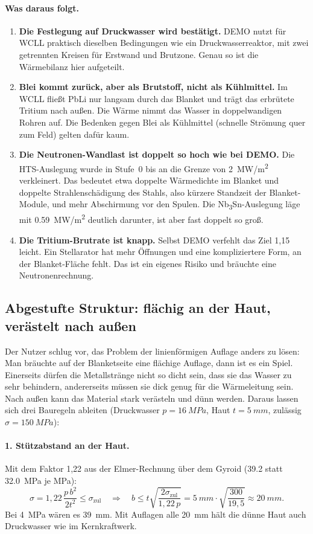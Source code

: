 \documentclass[10pt,a4paper]{article}
\begin{document}
\paragraph{Was daraus folgt.}
\begin{enumerate}\itemsep1pt
\item \textbf{Die Festlegung auf Druckwasser wird bestätigt.} DEMO nutzt für WCLL praktisch dieselben Bedingungen
  wie ein Druckwasserreaktor, mit zwei getrennten Kreisen für Erstwand und Brutzone. Genau so ist die Wärmebilanz
  hier aufgeteilt.
\item \textbf{Blei kommt zurück, aber als Brutstoff, nicht als Kühlmittel.} Im WCLL fließt PbLi nur langsam
  durch das Blanket und trägt das erbrütete Tritium nach außen. Die Wärme nimmt das Wasser in doppelwandigen
  Rohren auf. Die Bedenken gegen Blei als Kühlmittel (schnelle Strömung quer zum Feld) gelten dafür kaum.
\item \textbf{Die Neutronen-Wandlast ist doppelt so hoch wie bei DEMO.} Die HTS-Auslegung wurde in Stufe~0 bis
  an die Grenze von \SI{2}{MW/m^2} verkleinert. Das bedeutet etwa doppelte Wärmedichte im Blanket und doppelte
  Strahlenschädigung des Stahls, also kürzere Standzeit der Blanket-Module, und mehr Abschirmung vor den Spulen.
  Die Nb\textsubscript{3}Sn-Auslegung läge mit \SI{0,59}{MW/m^2} deutlich darunter, ist aber fast doppelt so groß.
\item \textbf{Die Tritium-Brutrate ist knapp.} Selbst DEMO verfehlt das Ziel 1,15 leicht. Ein Stellarator hat
  mehr Öffnungen und eine kompliziertere Form, an der Blanket-Fläche fehlt. Das ist ein eigenes Risiko und
  bräuchte eine Neutronenrechnung.
\end{enumerate}

\subsection{Abgestufte Struktur: flächig an der Haut, verästelt nach außen}
Der Nutzer schlug vor, das Problem der linienförmigen Auflage anders zu lösen: \glqq Man bräuchte auf der
Blanketseite eine flächige Auflage, dann ist es ein Spiel. Einerseits dürfen die Metallstränge nicht so dicht
sein, dass sie das Wasser zu sehr behindern, andererseits müssen sie dick genug für die Wärmeleitung sein. Nach
außen kann das Material stark verästeln und dünn werden.\grqq{} Daraus lassen sich drei Bauregeln ableiten
(Druckwasser $p = \SI{16}{MPa}$, Haut $t = \SI{5}{mm}$, zulässig $\sigma = \SI{150}{MPa}$):

\paragraph{1. Stützabstand an der Haut.} Mit dem Faktor 1,22 aus der Elmer-Rechnung über dem Gyroid
(\SI{39,2}{} statt \SI{32,0}{MPa} je MPa):
\[ \sigma = 1{,}22\,\frac{p\,b^2}{2t^2} \le \sigma_\text{zul}\quad\Rightarrow\quad
   b \le t\sqrt{\frac{2\sigma_\text{zul}}{1{,}22\,p}} = \SI{5}{mm}\cdot\sqrt{\frac{300}{19{,}5}} \approx \SI{20}{mm}. \]
Bei \SI{4}{MPa} wären es \SI{39}{mm}. Mit Auflagen alle \SI{20}{mm} hält die dünne Haut auch Druckwasser wie im
Kernkraftwerk.
\end{document}
